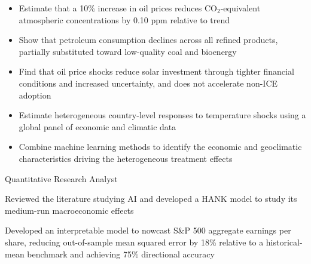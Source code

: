 \documentclass{practical-resume}
\begin{document}
\begin{itemize}[leftmargin=2.5em, itemsep=-0.25em, topsep=0.5em]\vspace{-0.3em}
\item Estimate that a 10\% increase in oil prices reduces CO$_2$-equivalent atmospheric concentrations by 0.10 ppm relative to trend
\item Show that petroleum consumption declines across all refined products, partially substituted toward low-quality coal and bioenergy
\item Find that oil price shocks reduce solar investment through tighter financial conditions and increased uncertainty, and does not accelerate non-ICE adoption
\end{itemize}
    
\begin{itemize}[leftmargin=2.5em, itemsep=-0.25em, topsep=0.5em]\vspace{-0.3em}
    \item Estimate heterogeneous country-level responses to temperature shocks using a global panel of economic and climatic data
    \item Combine machine learning methods to identify the economic and geoclimatic characteristics driving the heterogeneous treatment effects
\end{itemize}


	\begin{position}{Quantitative Research Analyst}{}	
		\item Reviewed the literature studying AI and developed a HANK model to study its medium-run macroeconomic effects
        \item Developed an interpretable model to nowcast S\&P 500 aggregate earnings per share, reducing out-of-sample mean squared error by 18\% relative to a historical-mean benchmark and achieving 75\% directional accuracy
	\end{position}
\end{document}
